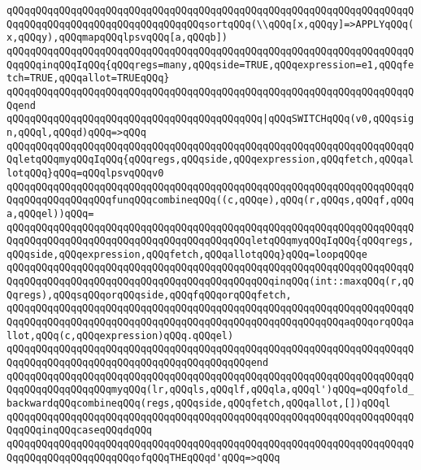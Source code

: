\verb|qQQqqQQqqQQqqQQqqQQqqQQqqQQqqQQqqQQqqQQqqQQqqQQqqQQqqQQqqQQqqQQqqQQqqQQqqQQqqQQqqQQqqQQqqQQqqQQqqQQqqQQqsortqQQq(\\qQQq[x,qQQqy]=>APPLYqQQq(x,qQQqy),qQQqmapqQQqlpsvqQQq[a,qQQqb])|\newline
\verb|qQQqqQQqqQQqqQQqqQQqqQQqqQQqqQQqqQQqqQQqqQQqqQQqqQQqqQQqqQQqqQQqqQQqqQQqqQQqinqQQqIqQQq{qQQqregs=many,qQQqside=TRUE,qQQqexpression=e1,qQQqfetch=TRUE,qQQqallot=TRUEqQQq}|\newline
\verb|qQQqqQQqqQQqqQQqqQQqqQQqqQQqqQQqqQQqqQQqqQQqqQQqqQQqqQQqqQQqqQQqqQQqqQQqend|\newline
\verb|qQQqqQQqqQQqqQQqqQQqqQQqqQQqqQQqqQQqqQQqqQQq|\verb#|qQQqSWITCHqQQq(v0,qQQqsign,qQQql,qQQqd)qQQq=>qQQq#\newline
\verb|qQQqqQQqqQQqqQQqqQQqqQQqqQQqqQQqqQQqqQQqqQQqqQQqqQQqqQQqqQQqqQQqqQQqqQQqletqQQqmyqQQqIqQQq{qQQqregs,qQQqside,qQQqexpression,qQQqfetch,qQQqallotqQQq}qQQq=qQQqlpsvqQQqv0|\newline
\verb|qQQqqQQqqQQqqQQqqQQqqQQqqQQqqQQqqQQqqQQqqQQqqQQqqQQqqQQqqQQqqQQqqQQqqQQqqQQqqQQqqQQqqQQqfunqQQqcombineqQQq((c,qQQqe),qQQq(r,qQQqs,qQQqf,qQQqa,qQQqel))qQQq=|\newline
\verb|qQQqqQQqqQQqqQQqqQQqqQQqqQQqqQQqqQQqqQQqqQQqqQQqqQQqqQQqqQQqqQQqqQQqqQQqqQQqqQQqqQQqqQQqqQQqqQQqqQQqqQQqqQQqqQQqletqQQqmyqQQqIqQQq{qQQqregs,qQQqside,qQQqexpression,qQQqfetch,qQQqallotqQQq}qQQq=loopqQQqe|\newline
\verb|qQQqqQQqqQQqqQQqqQQqqQQqqQQqqQQqqQQqqQQqqQQqqQQqqQQqqQQqqQQqqQQqqQQqqQQqqQQqqQQqqQQqqQQqqQQqqQQqqQQqqQQqqQQqqQQqqQQqinqQQq(int::maxqQQq(r,qQQqregs),qQQqsqQQqorqQQqside,qQQqfqQQqorqQQqfetch,|\newline
\verb|qQQqqQQqqQQqqQQqqQQqqQQqqQQqqQQqqQQqqQQqqQQqqQQqqQQqqQQqqQQqqQQqqQQqqQQqqQQqqQQqqQQqqQQqqQQqqQQqqQQqqQQqqQQqqQQqqQQqqQQqqQQqqQQqaqQQqorqQQqallot,qQQq(c,qQQqexpression)qQQq.qQQqel)|\newline
\verb|qQQqqQQqqQQqqQQqqQQqqQQqqQQqqQQqqQQqqQQqqQQqqQQqqQQqqQQqqQQqqQQqqQQqqQQqqQQqqQQqqQQqqQQqqQQqqQQqqQQqqQQqqQQqqQQqend|\newline
\verb|qQQqqQQqqQQqqQQqqQQqqQQqqQQqqQQqqQQqqQQqqQQqqQQqqQQqqQQqqQQqqQQqqQQqqQQqqQQqqQQqqQQqqQQqmyqQQq(lr,qQQqls,qQQqlf,qQQqla,qQQql')qQQq=qQQqfold_backwardqQQqcombineqQQq(regs,qQQqside,qQQqfetch,qQQqallot,[])qQQql|\newline
\newline
\verb|qQQqqQQqqQQqqQQqqQQqqQQqqQQqqQQqqQQqqQQqqQQqqQQqqQQqqQQqqQQqqQQqqQQqqQQqqQQqinqQQqcaseqQQqdqQQq|\newline
\verb|qQQqqQQqqQQqqQQqqQQqqQQqqQQqqQQqqQQqqQQqqQQqqQQqqQQqqQQqqQQqqQQqqQQqqQQqqQQqqQQqqQQqqQQqqQQqofqQQqTHEqQQqd'qQQq=>qQQq|\newline
